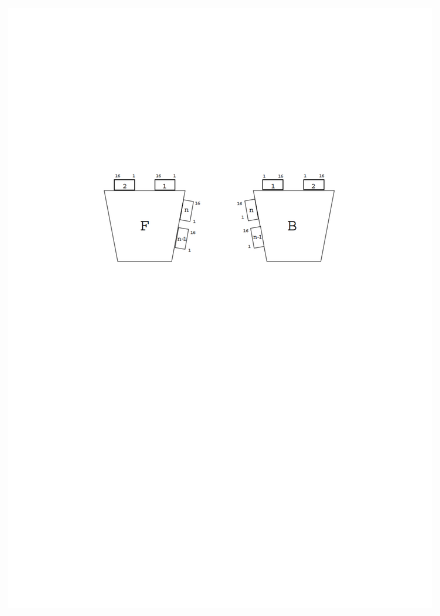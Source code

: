\begin{figure}[H]
		\begin{minipage}{0.49\hsize}
		\centering
        \includegraphics[width=\textwidth,page=2]{img/pdf/TGC.pdf}
        \end{minipage}
        \begin{minipage}{0.49\hsize}
        \centering

\end{minipage}
\end{figure}
